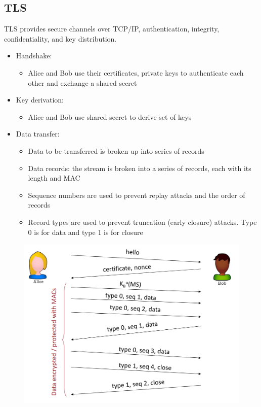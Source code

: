 \documentclass[10pt,a4paper]{report}
\begin{document}
\subsection{TLS}
TLS provides secure channels over TCP/IP, authentication, integrity, confidentiality, and key distribution.
\begin{itemize}
\item Handshake:
\begin{itemize}
\item Alice and Bob use their certificates, private keys to authenticate each other and exchange a shared secret
\end{itemize}
\item Key derivation: 
\begin{itemize}
\item Alice and Bob use shared secret to derive set of keys
\end{itemize}
\item Data transfer:
\begin{itemize}
\item Data to be transferred is broken up into series of records
\item Data records: the stream is broken into a series of records, each with its length and MAC
\item Sequence numbers are used to prevent replay attacks and the order of records
\item Record types are used to prevent truncation (early closure) attacks. Type 0 is for data and type 1 is for closure
\end{itemize}
\end{itemize}
\begin{figure}[H]
\centering
\includegraphics[scale=0.40]{20.png}
\end{figure}
\end{document}
